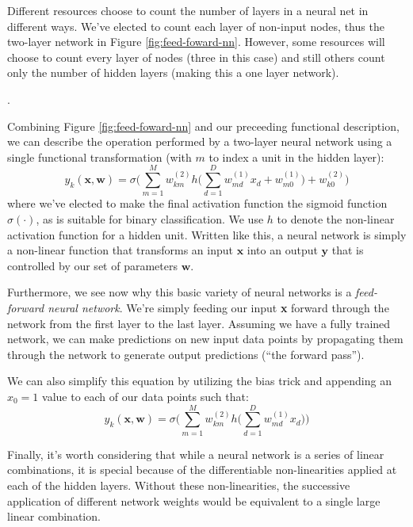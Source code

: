 \begin{warning}
    Different resources choose to count the number of layers in a neural net in different ways. We've elected to count each layer of non-input nodes, thus the two-layer network in Figure \ref{fig:feed-foward-nn}. However, some resources will choose to count every layer of nodes (three in this case) and still others count only the number of hidden layers (making this a one layer network).
\end{warning}. 

Combining Figure \ref{fig:feed-foward-nn} and our preceeding functional description, we can describe the operation performed by a two-layer neural network using a single functional transformation (with $m$ to index a unit in the hidden layer):
%
\begin{equation} \label{full-nn-equation}
	y_{k}(\textbf{x}, \textbf{w}) = \sigma\bigg(\sum_{m=1}^{M}w_{km}^{(2)} h\bigg(\sum_{d=1}^{D}w_{md}^{(1)}x_{d} + w_{m0}^{(1)}\bigg) + w_{k0}^{(2)}\bigg)
\end{equation}
where we've elected to make the final activation function the sigmoid function $\sigma(\cdot)$, as is suitable for binary classification.  We use $h$ to denote the non-linear activation function for a hidden unit.
%
Written like this, a neural network is simply a non-linear function that transforms an input $\textbf{x}$ into an output $\textbf{y}$ that is controlled by our set of parameters $\textbf{w}$.

Furthermore, we see now why this  basic variety of neural networks is a \textit{feed-forward neural network}. We're  simply feeding our input \textbf{x} forward through the network from the first layer to the last layer. Assuming we have a fully trained network, we can make predictions on new input data points by propagating them through the network to generate output predictions (``the forward pass'').

We can also simplify this equation by utilizing the bias trick and appending an $x_{0}=1$ value to each of our data points such that:
\begin{equation*}
	y_{k}(\textbf{x}, \textbf{w}) = \sigma\bigg(\sum_{m=1}^{M}w_{km}^{(2)} h\bigg(\sum_{d=1}^{D}w_{md}^{(1)}x_{d}\bigg)\bigg)
\end{equation*}

Finally, it's worth considering that while a neural network is a series of linear combinations, it is special because of the differentiable non-linearities applied at each of the hidden layers. Without these non-linearities, the successive application of different network weights would be equivalent to a single large linear combination.

